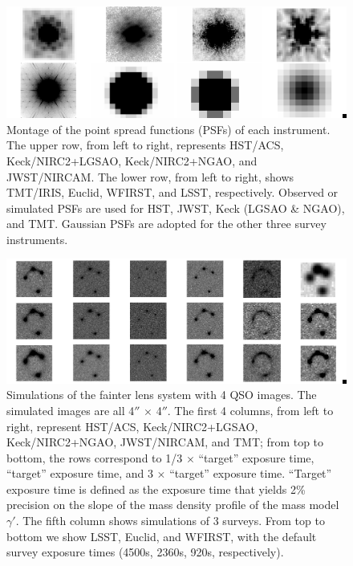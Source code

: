 \documentclass[a4paper,11pt]{article}
\begin{document}
\begin{figure}
\begin{center}
\includegraphics[width=1.0\textwidth]{figures/PSF_montage.png}
\end{center}
\caption{Montage of the point spread functions (PSFs) of each instrument. The upper row, from left to right, represents HST/ACS, Keck/NIRC2+LGSAO, Keck/NIRC2+NGAO, and JWST/NIRCAM. The lower row, from left to right, shows TMT/IRIS, Euclid, WFIRST, and LSST, respectively. Observed or simulated PSFs are used for HST, JWST, Keck (LGSAO \& NGAO), and TMT. Gaussian PSFs are adopted for the other three survey instruments.}
\label{fig:PSF_montage}
\end{figure}



\begin{figure}
\begin{center}
\includegraphics[width=1.0\textwidth]{figures/fainter_system_4QSOimages_all.png}
\end{center}
\caption{Simulations of the fainter lens system with 4 QSO images. The simulated images are all 4$''$ $\times$ 4$''$. The first 4 columns, from left to right, represent HST/ACS, Keck/NIRC2+LGSAO, Keck/NIRC2+NGAO, JWST/NIRCAM, and TMT; from top to bottom, the rows correspond to 1/3 $\times$ ``target'' exposure time, ``target'' exposure time, and 3 $\times$ ``target'' exposure time. ``Target'' exposure time is defined as the exposure time that yields 2\% precision on the slope of the mass density profile of the mass model $\gamma'$. The fifth column shows simulations of 3 surveys. From top to bottom we show LSST, Euclid, and WFIRST, with the default survey exposure times (4500s, 2360s, 920s, respectively).}
\label{fig:fainter_4QSOimages_montage}
\end{figure}
\end{document}
